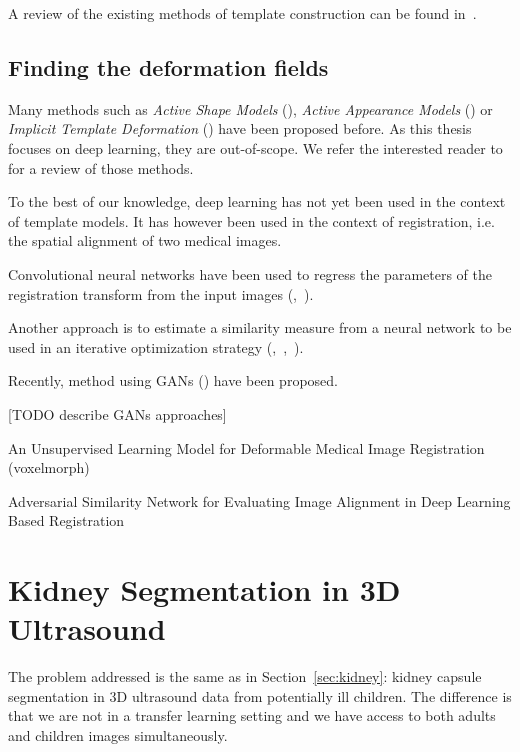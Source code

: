 A review of the existing methods of template construction can be found in~\textcite{cabezas2011}.

\subsection{Finding the deformation fields}

Many methods such as \textit{Active Shape Models} (\textcite{cootes1995}), \textit{Active Appearance Models} (\textcite{cootes1998ECCV}) or \textit{Implicit Template Deformation} (\textcite{mory2012MICCAI}) have been proposed before. As this thesis focuses on deep learning, they are out-of-scope. We refer the interested reader to~\textcite{heimann2009} for a review of those methods.

To the best of our knowledge, deep learning has not yet been used in the context of template models. It has however been used in the context of registration, i.e. the spatial alignment of two medical images.

Convolutional neural networks have been used to regress the parameters of the registration transform from the input images (\textcite{miao2016},~\textcite{yang2016}).

Another approach is to estimate a similarity measure from a neural network to be used in an iterative optimization strategy (\textcite{wu2013MICCAI},~\textcite{cheng2015},~\textcite{simonovosky2016MICCAI}).

Recently, method using GANs (\textcite{goodfellow2014}) have been proposed.  

[TODO describe GANs approaches]

An Unsupervised Learning Model for Deformable Medical Image Registration (voxelmorph)

Adversarial Similarity Network for Evaluating Image Alignment in Deep Learning Based Registration

\section{Kidney Segmentation in 3D Ultrasound}

The problem addressed is the same as in Section~\ref{sec:kidney}: kidney capsule segmentation in 3D ultrasound data from potentially ill children. The difference is that we are not in a transfer learning setting and we have access to both adults and children images simultaneously.

